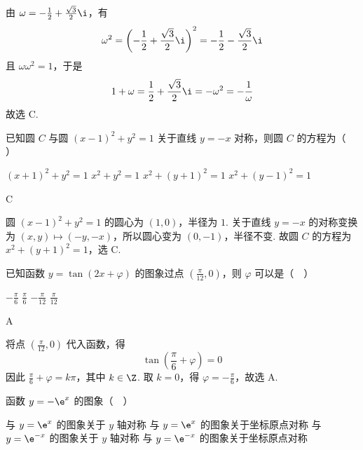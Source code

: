 \begin{solution}
由 \(\omega=-\frac12+\frac{\sqrt3}{2}\i\)，有
\[
\omega^2=\left(-\frac12+\frac{\sqrt3}{2}\i\right)^2=-\frac12-\frac{\sqrt3}{2}\i
\]
且 \(\omega\omega^2=1\)，于是
\[
1+\omega=\frac12+\frac{\sqrt3}{2}\i=-\omega^2=-\frac1\omega
\]
故选 C.
\end{solution}

\begin{problem}
已知圆 \(C\) 与圆 \((x - 1)^2 + y^2 = 1\) 关于直线 \(y = -x\) 对称，则圆 \(C\) 的方程为（\(\quad\)）

\choices
    {\((x + 1)^2 + y^2 = 1\)}
    {\(x^{2} + y^{2} = 1\)}
    {\(x^{2} + (y + 1)^{2} = 1\)}
    {\(x^{2} + (y - 1)^{2} = 1\)}
\end{problem}

\begin{answer}
C
\end{answer}

\begin{solution}
圆 \((x-1)^2+y^2=1\) 的圆心为 \((1,0)\)，半径为 \(1\). 关于直线 \(y=-x\) 的对称变换为 \((x,y)\mapsto(-y,-x)\)，所以圆心变为 \((0,-1)\)，半径不变. 故圆 \(C\) 的方程为 \(x^2+(y+1)^2=1\)，选 C.
\end{solution}

\begin{problem}
已知函数 \( y = \tan (2x + \varphi) \) 的图象过点 \( \left(\frac{\pi}{12}, 0\right) \)，则 \( \varphi \) 可以是（\(\quad\)）

\choices
    {\(-\frac{\pi}{6}\)}
    {\(\frac{\pi}{6}\)}
    {\(-\frac{\pi}{12}\)}
    {\(\frac{\pi}{12}\)}
\end{problem}

\begin{answer}
A
\end{answer}

\begin{solution}
将点 \(\left(\frac\pi{12},0\right)\) 代入函数，得
\[
\tan\left(\frac\pi6+\varphi\right)=0
\]
因此 \(\frac\pi6+\varphi=k\pi\)，其中 \(k\in\Z\). 取 \(k=0\)，得 \(\varphi=-\frac\pi6\)，故选 A.
\end{solution}

\begin{problem}
函数 \( y = -\e^{x} \) 的图象（\(\quad\)）

\choices
    {与 \(y = \e^{x}\) 的图象关于 \(y\) 轴对称}
    {与 \( y = \e^{x} \) 的图象关于坐标原点对称}
    {与 \( y = \e^{-x} \) 的图象关于 \( y \) 轴对称}
    {与 \( y = \e^{-x} \) 的图象关于坐标原点对称}
\end{problem}

